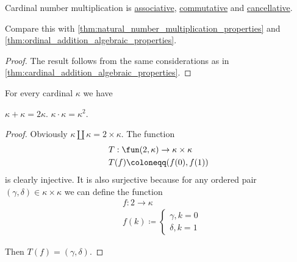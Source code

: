 \begin{proposition}\label{thm:cardinal_multiplication_algebraic_properties}
  Cardinal number multiplication is \hyperref[def:binary_operation/associative]{associative}, \hyperref[def:binary_operation/associative]{commutative} and \hyperref[def:binary_operation/cancellative]{cancellative}.

  Compare this with \cref{thm:natural_number_multiplication_properties} and \cref{thm:ordinal_addition_algebraic_properties}.
\end{proposition}
\begin{proof}
  The result follows from the same considerations as in \cref{thm:cardinal_addition_algebraic_properties}.
\end{proof}

\begin{proposition}\label{thm:double_and_square_of_cardinal}
  For every cardinal \( \kappa \) we have
  \begin{thmenum}
     \( \kappa + \kappa = 2\kappa \).
     \( \kappa \cdot \kappa = \kappa^2 \).
  \end{thmenum}
\end{proposition}
\begin{proof}
   Obviously \( \kappa \amalg \kappa = 2 \times \kappa \).
   The function
  \begin{equation*}
    \begin{aligned}
      &T: \fun(2, \kappa) \to \kappa \times \kappa \\
      &T(f) \coloneqq (f(0), f(1))
    \end{aligned}
  \end{equation*}
  is clearly injective. It is also surjective because for any ordered pair \( (\gamma, \delta) \in \kappa \times \kappa \) we can define the function
  \begin{equation*}
    \begin{aligned}
      &f: 2 \to \kappa \\
      &f(k) \coloneqq \begin{cases}
        \gamma, k = 0 \\
        \delta, k = 1
      \end{cases}
    \end{aligned}
  \end{equation*}

  Then \( T(f) = (\gamma, \delta) \).
\end{proof}

